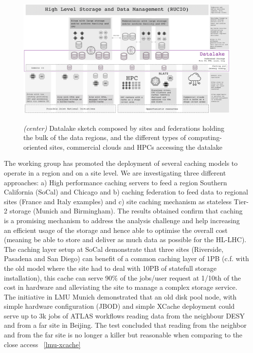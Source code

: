 \begin{figure}[h]
  \centering
  \includegraphics[height=6.8cm]{datalake-sketch.png}
  \caption{{\em (center)} Datalake sketch composed by sites and federations holding the bulk of the data regions, and the different types of computing-oriented sites, commercial clouds and HPCs accessing the datalake }
  \label{fig:datalake-sketch}
\end{figure}
The working group has promoted the deployment of several caching models to operate in a region and on a site level. We are investigating three different approaches: a) High performance caching servers to feed a region Southern California (SoCal) and Chicago and b) caching federation to feed data to regional sites (France and Italy examples) and c) site caching mechanism as stateless Tier-2 storage (Munich and Birmingham). The results obtained confirm that caching is a promising mechanism to address the analysis challenge and help increasing an efficient usage of the storage and hence able to optimise the overall cost (meaning be able to store and deliver as much data as possible for the HL-LHC). \\
The caching layer setup at SoCal demonstrate that three sites (Riverside, Pasadena and San Diego) can benefit of a common caching layer of 1PB (c.f. with the old model where the site had to deal with 10PB of statefull storage installation), this cache can serve 90\% of the jobs/user request at 1/10th of the cost in hardware and alleviating the site to manage a complex storage service.\\
The initiative in LMU Munich demonstrated that an old disk pool node, with simple hardware configuration (JBOD) and simple XCache deployment could serve up to 3k jobs of ATLAS workflows reading data from the neighbour DESY and from a far site in Beijing. The test concluded that reading from the neighbor and from the far site is no longer a killer but reasonable when comparing to the close access ~\ref{lmu-xcache}

